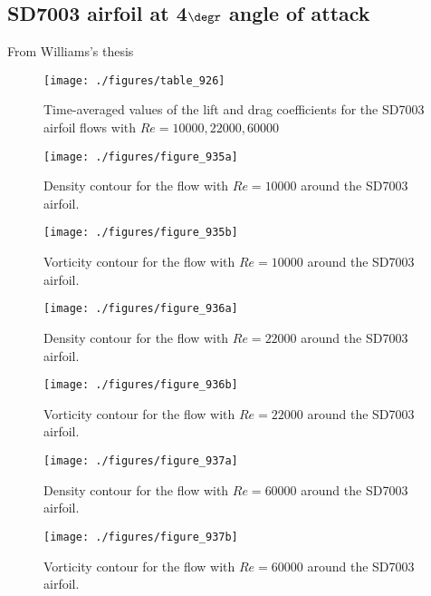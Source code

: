 \subsection{SD7003 airfoil at 4$\degr$ angle of attack}
From Williams's thesis\cite{williams2013thesis}

\begin{figure}
\centering
\texttt{[image: ./figures/table\_926]} \\
\caption{Time-averaged values of the lift and drag coefficients for the SD7003 airfoil flows with $Re = 10000, 22000, 60000$}
\label{fig:table_926}
\end{figure}

\begin{figure}
\centering
\texttt{[image: ./figures/figure\_935a]} \\
\caption{Density contour for the flow with $Re = 10000$ around the SD7003 airfoil.}
\label{fig:figure_935a}
\end{figure}

\begin{figure}
\centering
\texttt{[image: ./figures/figure\_935b]} \\
\caption{Vorticity contour for the flow with $Re = 10000$ around the SD7003 airfoil.}
\label{fig:figure_935b}
\end{figure}

\begin{figure}
\centering
\texttt{[image: ./figures/figure\_936a]} \\
\caption{Density contour for the flow with $Re = 22000$ around the SD7003 airfoil.}
\label{fig:figure_936a}
\end{figure}

\begin{figure}
\centering
\texttt{[image: ./figures/figure\_936b]} \\
\caption{Vorticity contour for the flow with $Re = 22000$ around the SD7003 airfoil.}
\label{fig:figure_936b}
\end{figure}

\begin{figure}
\centering
\texttt{[image: ./figures/figure\_937a]} \\
\caption{Density contour for the flow with $Re = 60000$ around the SD7003 airfoil.}
\label{fig:figure_937a}
\end{figure}

\begin{figure}
\centering
\texttt{[image: ./figures/figure\_937b]} \\
\caption{Vorticity contour for the flow with $Re = 60000$ around the SD7003 airfoil.}
\label{fig:figure_937b}
\end{figure}
\newpage
